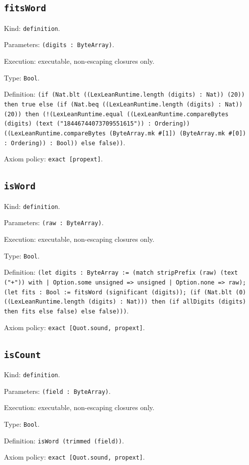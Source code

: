 \documentclass[11pt]{article}
\begin{document}
\subsection*{\texttt{fitsWord}}
\noindent Kind: \texttt{definition}.\par
\noindent Parameters: \texttt{(digits : ByteArray)}.\par
\noindent Execution: executable, non-escaping closures only.\par
\noindent Type: \texttt{Bool}.\par
\noindent Definition: \texttt{(if (Nat.blt ((LexLeanRuntime.length (digits) : Nat)) (20)) then true else (if (Nat.beq ((LexLeanRuntime.length (digits) : Nat)) (20)) then (!(LexLeanRuntime.equal ((LexLeanRuntime.compareBytes (digits) (text ("18446744073709551615")) : Ordering)) ((LexLeanRuntime.compareBytes (ByteArray.mk \#[1]) (ByteArray.mk \#[0]) : Ordering)) : Bool)) else false))}.\par
\noindent Axiom policy: \texttt{exact [propext]}.\par
\subsection*{\texttt{isWord}}
\noindent Kind: \texttt{definition}.\par
\noindent Parameters: \texttt{(raw : ByteArray)}.\par
\noindent Execution: executable, non-escaping closures only.\par
\noindent Type: \texttt{Bool}.\par
\noindent Definition: \texttt{(let digits : ByteArray := (match stripPrefix (raw) (text ("+")) with | Option.some unsigned => unsigned | Option.none => raw); (let fits : Bool := fitsWord (significant (digits)); (if (Nat.blt (0) ((LexLeanRuntime.length (digits) : Nat))) then (if allDigits (digits) then fits else false) else false)))}.\par
\noindent Axiom policy: \texttt{exact [Quot.sound, propext]}.\par
\subsection*{\texttt{isCount}}
\noindent Kind: \texttt{definition}.\par
\noindent Parameters: \texttt{(field : ByteArray)}.\par
\noindent Execution: executable, non-escaping closures only.\par
\noindent Type: \texttt{Bool}.\par
\noindent Definition: \texttt{isWord (trimmed (field))}.\par
\noindent Axiom policy: \texttt{exact [Quot.sound, propext]}.\par
\end{document}
